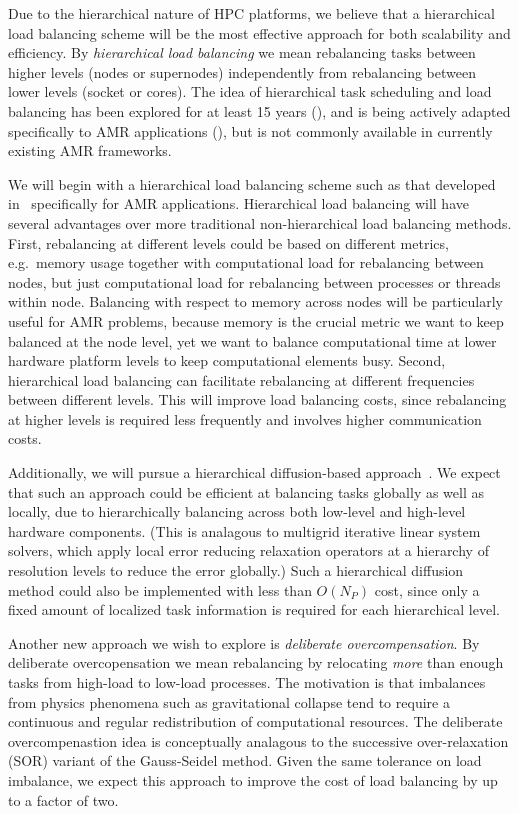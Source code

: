 \documentclass[10pt]{article}
\begin{document}
Due to the hierarchical nature of HPC platforms, we believe that a
hierarchical load balancing scheme will be the most effective approach
for both scalability and efficiency.  By \textit{hierarchical load
  balancing} we mean rebalancing tasks between higher levels (nodes or
supernodes) independently from rebalancing between lower levels
(socket or cores).  The idea of hierarchical task scheduling and load
balancing has been explored for at least 15 years (\cite{AhGh94}), and
is being actively adapted specifically to AMR applications
(\cite{LaTa06}), but is not commonly available in currently existing
AMR frameworks.

We will begin with a hierarchical load balancing scheme such as that
developed in~\cite{LaTa06} specifically for AMR applications.
Hierarchical load balancing will have several advantages over more
traditional non-hierarchical load balancing methods.  First,
rebalancing at different levels could be based on different metrics,
e.g.~memory usage together with computational load for rebalancing
between nodes, but just computational load for rebalancing between
processes or threads within node.  Balancing with respect to memory
across nodes will be particularly useful for AMR problems, because
memory is the crucial metric we want to keep balanced at the node
level, yet we want to balance computational time at lower hardware
platform levels to keep computational elements busy.  Second,
hierarchical load balancing can facilitate rebalancing at different
frequencies between different levels.  This will improve load
balancing costs, since rebalancing at higher levels is required less
frequently and involves higher communication costs.

Additionally, we will pursue a hierarchical diffusion-based
approach~\cite{MeMo09}.  We expect that such an approach could be
efficient at balancing tasks globally as well as locally, due to
hierarchically balancing across both low-level and high-level hardware
components.  (This is analagous to multigrid iterative linear system
solvers, which apply local error reducing relaxation operators at a
hierarchy of resolution levels to reduce the error globally.)  Such a
hierarchical diffusion method could also be implemented with less than
$O(N_P)$ cost, since only a fixed amount of localized task information
is required for each hierarchical level.

%
Another new approach we wish to explore is \textit{deliberate
  overcompensation}.  By deliberate overcopensation we mean
rebalancing by relocating \textit{more} than enough tasks from
high-load to low-load processes.  The motivation is that imbalances
from physics phenomena such as gravitational collapse tend to require
a continuous and regular redistribution of computational resources.
The deliberate overcompenastion idea is conceptually analagous to the
successive over-relaxation (SOR) variant of the Gauss-Seidel method.
Given the same tolerance on load imbalance, we expect this approach to
improve the cost of load balancing by up to a factor of two.
\end{document}
